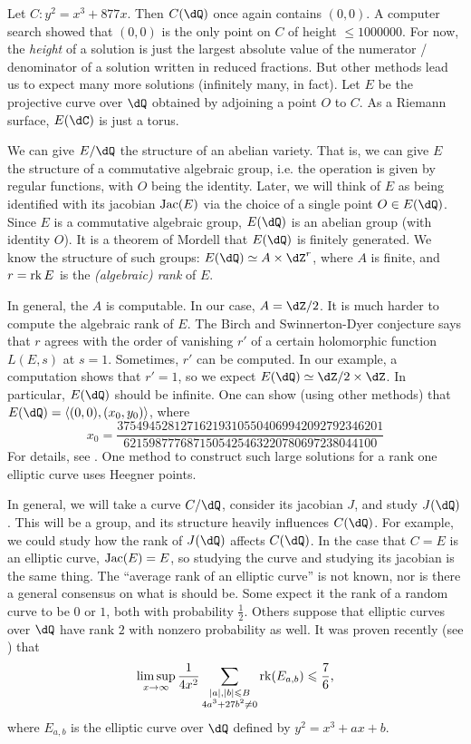 \documentclass{article}
\begin{document}
\begin{example}
Let $C:y^2=x^3+877 x$. Then $C(\dQ)$ once again contains $(0,0)$. A 
computer search showed that $(0,0)$ is the only point on $C$ of height 
$\leqslant 1000000$. For now, the \emph{height} of a solution is just the 
largest absolute value of the numerator / denominator of a solution written 
in reduced fractions. But other methods lead us to expect many more solutions
(infinitely many, in fact). Let $E$ be the projective curve over $\dQ$ obtained 
by adjoining a point $O$ to $C$. As a Riemann surface, $E(\dC)$ is just a 
torus. 

We can give $E/\dQ$ the 
structure of an abelian variety. That is, we can give $E$ the structure of a 
commutative algebraic group, i.e. the operation is given by regular  
functions, with $O$ being the identity. Later, we will think of $E$ as 
being identified with its jacobian $\operatorname{Jac}(E)$ via the choice of a single point 
$O\in E(\dQ)$. Since $E$ is a commutative algebraic group, $E(\dQ)$ is an 
abelian group (with identity $O$). It is a theorem of Mordell that $E(\dQ)$ is 
finitely generated. We know the structure of such groups: 
$E(\dQ)\simeq A\times \dZ^r$, where $A$ is finite, and $r=\operatorname{rk} E$ 
is the \emph{(algebraic) rank} of $E$. 

In general, the $A$ is computable. In our case, $A=\dZ/2$. It is much harder to 
compute the algebraic rank of $E$. The Birch and Swinnerton-Dyer 
conjecture says that $r$ agrees with the order of vanishing $r'$ of a certain 
holomorphic function $L(E,s)$ at $s=1$. Sometimes, $r'$ can be computed.  
In our example, a computation shows that $r'=1$, so we expect 
$E(\dQ)\simeq \dZ/2\times\dZ$. In particular, 
$E(\dQ)$ should be infinite. One can show (using other methods) that 
$E(\dQ)=\langle (0,0),(x_0,y_0)\rangle$, where 
\[
  x_0 = \frac{37 5494 5281 2716 2193 1055 0406 9942 0927 9234 6201}{6215 9877 7687 1505 4254 6322 0780 6972 3804 4100}
\]
For details, see \cite{br84}. One method to construct such large solutions for 
a rank one elliptic curve uses Heegner points. 
\end{example}

In general, we will take a curve $C/\dQ$, consider its jacobian $J$, and study 
$J(\dQ)$. This will be a group, and its structure heavily influences $C(\dQ)$. 
For example, we could study how the rank of $J(\dQ)$ affects $C(\dQ)$. In the 
case that $C=E$ is an elliptic curve, $\operatorname{Jac}(E)=E$, so studying the curve and 
studying its jacobian is the same thing. The ``average rank of an elliptic 
curve'' is not known, nor is there a general consensus on what is should be. 
Some expect it the rank of a random curve to be $0$ or $1$, both with 
probability $\frac 1 2$. Others suppose that elliptic curves over $\dQ$ have 
rank $2$ with nonzero probability as well. It was proven recently (see 
\cite[\S 1]{bh10}) that 
\[
  \limsup_{x\to\infty} \frac{1}{4 x^2} \sum_{\substack{|a|,|b|\leqslant B \\ 4 a^3+27 b^2\ne 0}} \operatorname{rk}(E_{a,b}) \leqslant\frac 7 6 \text{,}
\]
where $E_{a,b}$ is the elliptic curve over $\dQ$ defined by $y^2=x^3 +a x+b$.
\end{document}
